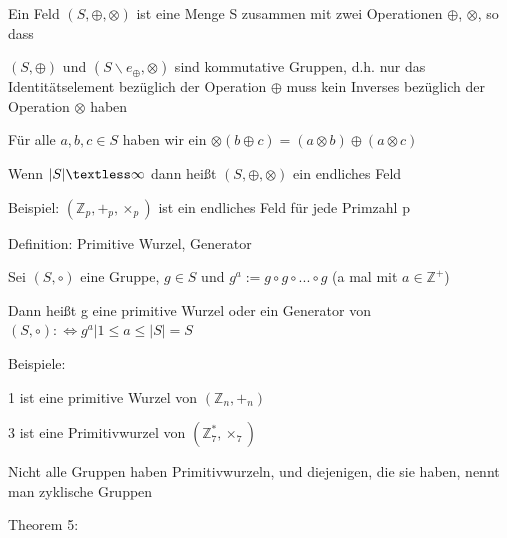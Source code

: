 \documentclass[a4paper]{article}
\begin{document}
\begin{multicols}{3}
\begin{itemize*}
\begin{itemize*}
                  \begin{itemize*}
                        \item Ein Feld $(S,\oplus, \otimes)$ ist eine Menge S zusammen mit zwei Operationen $\oplus$, $\otimes$, so dass
                        \begin{itemize*}
                              \item $(S,\oplus)$ und $(S\backslash{e_{\oplus}},\otimes)$ sind kommutative Gruppen, d.h. nur das Identitätselement bezüglich der Operation $\oplus$ muss kein Inverses bezüglich der Operation $\otimes$ haben
                              \item Für alle $a,b,c\in S$ haben wir ein $\otimes(b\oplus c)=(a\otimes b)\oplus(a\otimes c)$
                        \end{itemize*}
                  \end{itemize*}
                  \item Wenn $| S|\textless\infty$ dann heißt $(S,\oplus,\otimes)$ ein endliches Feld
            \end{itemize*}
            \item Beispiel: $(\mathbb{Z}_p, +_p, \times_p)$ ist ein endliches Feld für jede Primzahl p
            \item Definition: Primitive Wurzel, Generator
            \begin{itemize*}
                  \item Sei $(S,\circ)$ eine Gruppe, $g\in S$ und $g^a:=g\circ g\circ...\circ g$ (a mal mit $a\in\mathbb{Z}^+$)
                  \item Dann heißt g eine primitive Wurzel oder ein Generator von $(S,\circ):\Leftrightarrow{g^a|1\leq a\leq | S|}=S$
                  \item Beispiele:
                  \begin{itemize*}
                        \item 1 ist eine primitive Wurzel von $(\mathbb{Z}_n, +_n)$
                        \item 3 ist eine Primitivwurzel von $(\mathbb{Z}^*_7, \times_7)$
                  \end{itemize*}
                  \item Nicht alle Gruppen haben Primitivwurzeln, und diejenigen, die sie haben, nennt man zyklische Gruppen
            \end{itemize*}
            \item Theorem 5:
            \begin{itemize*}

\end{itemize*}
\end{itemize*}
\end{multicols}
\end{document}
